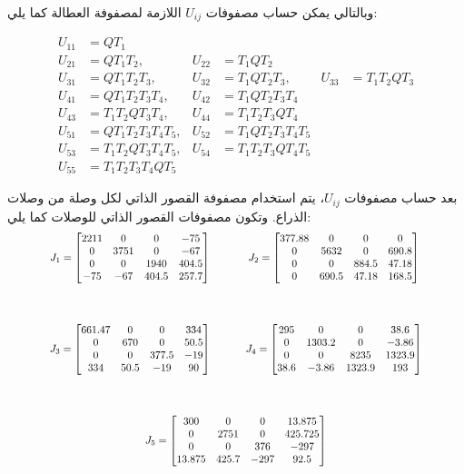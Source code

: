 وبالتالي يمكن حساب مصفوفات $U_{ij}$ اللازمة لمصفوفة العطالة كما يلي:

\begin{align}
U_{11} &= Q T_1
\\
U_{21} &= Q T_1T_2,
&
U_{22} &= T_1QT_2
\\
U_{31} &= Q T_1T_2T_3,
&
U_{32} &= T_1QT_2T_3,
&
U_{33} &= T_1T_2QT_3
\\
U_{41} &= Q T_1T_2T_3T_4,
&
U_{42} &= T_1QT_2T_3T_4
\\
U_{43} &= T_1T_2QT_3T_4,
&
U_{44} &= T_1T_2T_3QT_4
\\
U_{51} &= Q T_1T_2T_3T_4T_5,
&
U_{52} &= T_1QT_2T_3T_4T_5
\\
U_{53} &= T_1T_2QT_3T_4T_5,
&
U_{54} &= T_1T_2T_3QT_4T_5
\\
U_{55} &= T_1T_2T_3T_4QT_5
\end{align}

بعد حساب مصفوفات $U_{ij}$، يتم استخدام مصفوفة القصور الذاتي لكل وصلة من وصلات الذراع. وتكون مصفوفات القصور الذاتي للوصلات كما يلي:
\[
\resizebox{0.85\textwidth}{!}{$
\begin{array}{@{}c@{\hspace{1.2cm}}c@{}}

J_1 =
\begin{bmatrix}
2211 & 0 & 0 & -75 \\
0 & 3751 & 0 & -67 \\
0 & 0 & 1940 & 404.5 \\
-75 & -67 & 404.5 & 257.7
\end{bmatrix}
&
J_2 =
\begin{bmatrix}
377.88 & 0 & 0 & 0 \\
0 & 5632 & 0 & 690.8 \\
0 & 0 & 884.5 & 47.18 \\
0 & 690.5 & 47.18 & 168.5
\end{bmatrix}
\\[2cm]

J_3 =
\begin{bmatrix}
661.47 & 0 & 0 & 334 \\
0 & 670 & 0 & 50.5 \\
0 & 0 & 377.5 & -19 \\
334 & 50.5 & -19 & 90
\end{bmatrix}
&
J_4 =
\begin{bmatrix}
295 & 0 & 0 & 38.6 \\
0 & 1303.2 & 0 & -3.86 \\
0 & 0 & 8235 & 1323.9 \\
38.6 & -3.86 & 1323.9 & 193
\end{bmatrix}
\\[2cm]

\multicolumn{2}{c}{
J_5 =
\begin{bmatrix}
300 & 0 & 0 & 13.875 \\
0 & 2751 & 0 & 425.725 \\
0 & 0 & 376 & -297 \\
13.875 & 425.7 & -297 & 92.5
\end{bmatrix}
}

\end{array}
$}
\]





